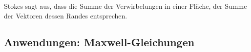 Stokes sagt aus, dass die Summe der Verwirbelungen in einer Fläche, der Summe der Vektoren dessen Randes entsprechen.

\subsection{Anwendungen: Maxwell-Gleichungen}


